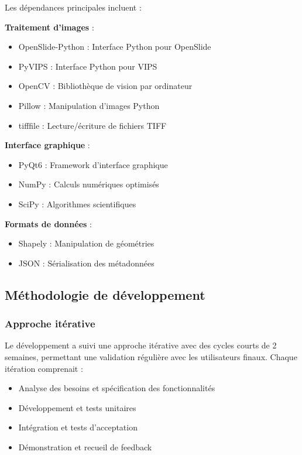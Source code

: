 \documentclass[12pt,a4paper]{report}
\begin{document}
Les dépendances principales incluent :

\textbf{Traitement d'images} :
\begin{itemize}
\item OpenSlide-Python : Interface Python pour OpenSlide
\item PyVIPS : Interface Python pour VIPS
\item OpenCV : Bibliothèque de vision par ordinateur
\item Pillow : Manipulation d'images Python
\item tifffile : Lecture/écriture de fichiers TIFF
\end{itemize}

\textbf{Interface graphique} :
\begin{itemize}
\item PyQt6 : Framework d'interface graphique
\item NumPy : Calculs numériques optimisés
\item SciPy : Algorithmes scientifiques
\end{itemize}

\textbf{Formats de données} :
\begin{itemize}
\item Shapely : Manipulation de géométries
\item JSON : Sérialisation des métadonnées
\end{itemize}

\subsection{Méthodologie de développement}

\subsubsection{Approche itérative}

Le développement a suivi une approche itérative avec des cycles courts de 2 semaines, permettant une validation régulière avec les utilisateurs finaux. Chaque itération comprenait :
\begin{itemize}
\item Analyse des besoins et spécification des fonctionnalités
\item Développement et tests unitaires
\item Intégration et tests d'acceptation
\item Démonstration et recueil de feedback
\end{itemize}
\end{document}
